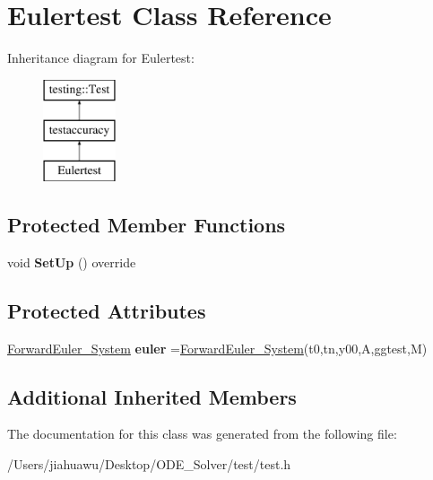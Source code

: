 \hypertarget{class_eulertest}{}\section{Eulertest Class Reference}
\label{class_eulertest}
Inheritance diagram for Eulertest\+:\begin{figure}[H]
\begin{center}
\leavevmode
\includegraphics[height=3.000000cm]{class_eulertest}
\end{center}
\end{figure}
\subsection*{Protected Member Functions}
\begin{DoxyCompactItemize}
\item 
\mbox{\label{class_eulertest_a99abff98e4ff32cfb21240652b974b6b}} 
void {\bfseries Set\+Up} () override
\end{DoxyCompactItemize}
\subsection*{Protected Attributes}
\begin{DoxyCompactItemize}
\item 
\mbox{\label{class_eulertest_ac70f0da356cad71ce285ee978525e0c4}} 
\mbox{\hyperlink{class_forward_euler___system}{Forward\+Euler\+\_\+\+System}} {\bfseries euler} =\mbox{\hyperlink{class_forward_euler___system}{Forward\+Euler\+\_\+\+System}}(t0,tn,y00,A,ggtest,M)
\end{DoxyCompactItemize}
\subsection*{Additional Inherited Members}


The documentation for this class was generated from the following file\+:\begin{DoxyCompactItemize}
\item 
/\+Users/jiahuawu/\+Desktop/\+O\+D\+E\+\_\+\+Solver/test/test.\+h\end{DoxyCompactItemize}
